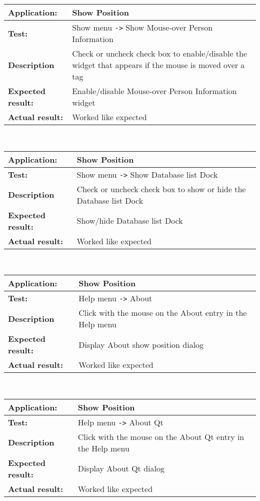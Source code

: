    \begin{tabular}{|p{3.5cm}|p{10.5cm}|}
    \hline
     \textbf{Application:}	& Show Position\\
    \hline
     \textbf{Test:}		& Show menu \verb=->= Show Mouse-over Person Information\\
    \hline
     \textbf{Description}	& Check or uncheck check box to enable/disable the widget that appears if the mouse is moved over a tag\\
    \hline
     \textbf{Expected result:}	& Enable/disable Mouse-over Person Information widget\\
    \hline
     \textbf{Actual result:}	& Worked like expected\\
    \hline
   \end{tabular}\\
   \begin{tabular}{|p{3.5cm}|p{10.5cm}|}
    \hline
     \textbf{Application:}	& Show Position\\
    \hline
     \textbf{Test:}		& Show menu \verb=->= Show Database list Dock\\
    \hline
     \textbf{Description}	& Check or uncheck check box to show or hide the Database list Dock\\
    \hline
     \textbf{Expected result:}	& Show/hide Database list Dock\\
    \hline
     \textbf{Actual result:}	& Worked like expected\\
    \hline
   \end{tabular}\\
   \begin{tabular}{|p{3.5cm}|p{10.5cm}|}
    \hline
     \textbf{Application:}	& Show Position\\
    \hline
     \textbf{Test:}		& Help menu \verb=->= About\\
    \hline
     \textbf{Description}	& Click with the mouse on the About entry in the Help menu\\
    \hline
     \textbf{Expected result:}	& Display About show position dialog\\
    \hline
     \textbf{Actual result:}	& Worked like expected\\
    \hline
   \end{tabular}\\
   \begin{tabular}{|p{3.5cm}|p{10.5cm}|}
    \hline
     \textbf{Application:}	& Show Position\\
    \hline
     \textbf{Test:}		& Help menu \verb=->= About Qt\\
    \hline
     \textbf{Description}	& Click with the mouse on the About Qt entry in the Help menu\\
    \hline
     \textbf{Expected result:}	& Display About Qt dialog\\
    \hline
     \textbf{Actual result:}	& Worked like expected\\
    \hline
   \end{tabular}\\
